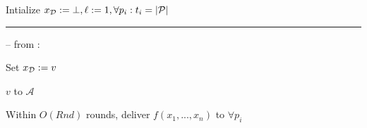 \begin{bbox}[title={$\Fbc (\mathcal{D}, \mathcal{P} = p_1,...,p_n)$}]

Intialize $x_{\mathcal{D}} := \bot, \ell := 1, \forall p_i : t_i = |\mathcal{P}|$

\vspace{2mm} \hrule \vspace{2mm}

-- \OnInput {} from \Partyi:
	
	\qquad Set $x_{\mathcal{D}} := v$

	\qquad \Leak $v$ to $\mathcal{A}$

	\qquad Within $O(Rnd)$ rounds, deliver $f(x_1,...,x_n)$ to $\forall p_i$

%
%	
%
%
%
%
%
%
\end{bbox}

